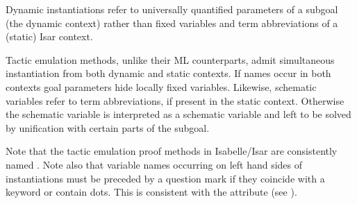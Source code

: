 \begin{isabellebody}
\begin{isamarkuptext}
  \begin{warn}
    Dynamic instantiations refer to universally quantified parameters
    of a subgoal (the dynamic context) rather than fixed variables and
    term abbreviations of a (static) Isar context.
  \end{warn}

  Tactic emulation methods, unlike their ML counterparts, admit
  simultaneous instantiation from both dynamic and static contexts.
  If names occur in both contexts goal parameters hide locally fixed
  variables.  Likewise, schematic variables refer to term
  abbreviations, if present in the static context.  Otherwise the
  schematic variable is interpreted as a schematic variable and left
  to be solved by unification with certain parts of the subgoal.

  Note that the tactic emulation proof methods in Isabelle/Isar are
  consistently named .  Note also that variable names
  occurring on left hand sides of instantiations must be preceded by a
  question mark if they coincide with a keyword or contain dots.  This
  is consistent with the attribute \mbox{} (see
  ).


\end{isamarkuptext}
\end{isabellebody}

